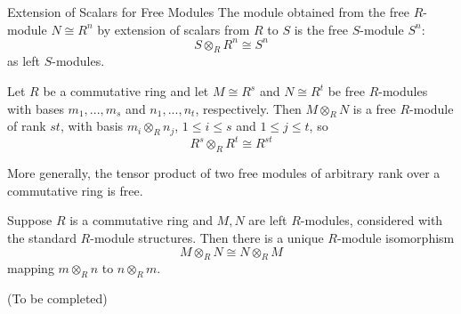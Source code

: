 \documentclass[12pt, a4paper, twoside, openright, titlepage]{book}
\begin{document}
\begin{cor}{Extension of Scalars for Free Modules}{}
    The module obtained from the free $R$-module $N \cong R^n$ by extension of scalars from $R$ to $S$ is the free $S$-module $S^n$: \begin{equation*}
        S\otimes_R R^n \cong S^n
    \end{equation*}
    as left $S$-modules.
\end{cor}

\begin{cor}{}{}
    Let $R$ be a commutative ring and let $M \cong R^s$ and $N \cong R^t$ be free $R$-modules with bases $m_1,...,m_s$ and $n_1,...,n_t$, respectively. Then $M\otimes_RN$ is a free $R$-module of rank $st$, with basis $m_i\otimes_Rn_j$, $1\leq i \leq s$ and $1 \leq j \leq t$, so \begin{equation*}
        R^s\otimes_RR^t\cong R^{st}
    \end{equation*}
\end{cor}

More generally, the tensor product of two free modules of arbitrary rank over a commutative ring is free.


\begin{prop}{}{}
    Suppose $R$ is a commutative ring and $M,N$ are left $R$-modules, considered with the standard $R$-module structures. Then there is a unique $R$-module isomorphism \begin{equation*}
        M\otimes_RN\cong N\otimes_RM
    \end{equation*}
    mapping $m\otimes_Rn$ to $n\otimes_Rm$.
\end{prop}
\begin{proof*}{}{}
    (To be completed)
\end{proof*}
\end{document}
